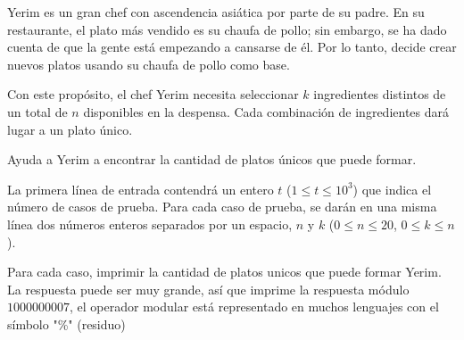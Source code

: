 
Yerim es un gran chef con ascendencia asiática por parte de su padre. En su restaurante, el plato más vendido es su chaufa de pollo; sin embargo, se ha dado cuenta de que la gente está empezando a cansarse de él. Por lo tanto, decide crear nuevos platos usando su chaufa de pollo como base.

Con este propósito, el chef Yerim necesita seleccionar $k$ ingredientes distintos de un total de $n$ disponibles en la despensa. Cada combinación de ingredientes dará lugar a un plato único.

Ayuda a Yerim a encontrar la cantidad de platos únicos que puede formar.


La primera línea de entrada contendrá un entero $t$ ($1\leq t \leq 10^3$) que indica el número de casos de prueba. Para cada caso de prueba, se darán en una misma línea dos números enteros separados por un espacio, $n$ y $k$ ($0 \leq n \leq 20$, $0 \leq k \leq n$).

\outputText

Para cada caso, imprimir la cantidad de platos unicos que puede formar Yerim.\\
La respuesta puede ser muy grande, así que imprime la respuesta módulo $1000000007$, el operador modular está representado en muchos lenguajes con el símbolo "\%" (residuo)

\exampleCases

\begin{example}
\end{example}
